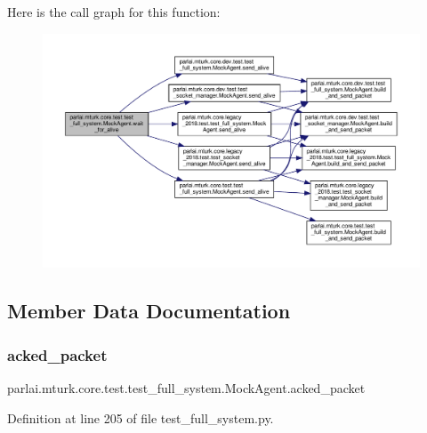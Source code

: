 Here is the call graph for this function\+:
\nopagebreak
\begin{figure}[H]
\begin{center}
\leavevmode
\includegraphics[width=350pt]{classparlai_1_1mturk_1_1core_1_1test_1_1test__full__system_1_1MockAgent_a92e5fffe32ac3011adeedbdc34b5506c_cgraph}
\end{center}
\end{figure}


\subsection{Member Data Documentation}
\mbox{\label{classparlai_1_1mturk_1_1core_1_1test_1_1test__full__system_1_1MockAgent_ae5535eef80df379284f6988f9c7078d0}} 
\subsubsection{\texorpdfstring{acked\+\_\+packet}{acked\_packet}}
{\footnotesize\ttfamily parlai.\+mturk.\+core.\+test.\+test\+\_\+full\+\_\+system.\+Mock\+Agent.\+acked\+\_\+packet}



Definition at line 205 of file test\+\_\+full\+\_\+system.\+py.




